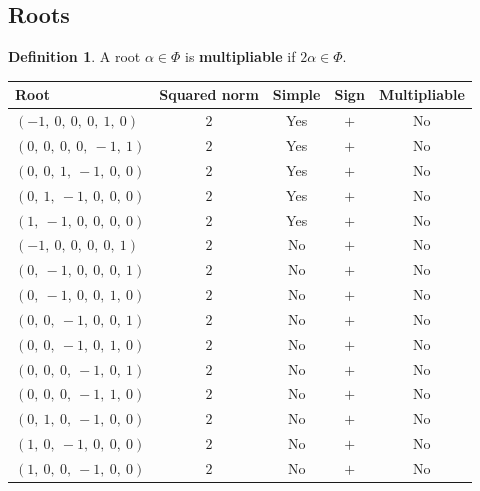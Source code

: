 \documentclass[11pt]{article}
\newcommand{\noi}{\noindent}
\newcommand{\tbf}{\textbf}
\theoremstyle{definition}
\newtheorem{definition}{Definition}[section]
\begin{document}
\subsection{Roots}

\begin{definition}
A root $\alpha \in \Phi$ is \tbf{multipliable} if $2\alpha \in \Phi$.
\end{definition}

\noi \begin{tabular}{|l|c|c|c|c|}
    \hline
    \textbf{Root} & \textbf{Squared norm} & \textbf{Simple} & \textbf{Sign} & \textbf{Multipliable} \\
    \hline
    $\left( -1, \  0, \  0, \  0, \  1, \  0\right)$ & $2$ & Yes & $+$ & No \\
    \hline
    $\left( 0, \  0, \  0, \  0, \  -1, \  1\right)$ & $2$ & Yes & $+$ & No \\
    \hline
    $\left( 0, \  0, \  1, \  -1, \  0, \  0\right)$ & $2$ & Yes & $+$ & No \\
    \hline
    $\left( 0, \  1, \  -1, \  0, \  0, \  0\right)$ & $2$ & Yes & $+$ & No \\
    \hline
    $\left( 1, \  -1, \  0, \  0, \  0, \  0\right)$ & $2$ & Yes & $+$ & No \\
    \hline
    $\left( -1, \  0, \  0, \  0, \  0, \  1\right)$ & $2$ & No & $+$ & No \\
    \hline
    $\left( 0, \  -1, \  0, \  0, \  0, \  1\right)$ & $2$ & No & $+$ & No \\
    \hline
    $\left( 0, \  -1, \  0, \  0, \  1, \  0\right)$ & $2$ & No & $+$ & No \\
    \hline
    $\left( 0, \  0, \  -1, \  0, \  0, \  1\right)$ & $2$ & No & $+$ & No \\
    \hline
    $\left( 0, \  0, \  -1, \  0, \  1, \  0\right)$ & $2$ & No & $+$ & No \\
    \hline
    $\left( 0, \  0, \  0, \  -1, \  0, \  1\right)$ & $2$ & No & $+$ & No \\
    \hline
    $\left( 0, \  0, \  0, \  -1, \  1, \  0\right)$ & $2$ & No & $+$ & No \\
    \hline
    $\left( 0, \  1, \  0, \  -1, \  0, \  0\right)$ & $2$ & No & $+$ & No \\
    \hline
    $\left( 1, \  0, \  -1, \  0, \  0, \  0\right)$ & $2$ & No & $+$ & No \\
    \hline
    $\left( 1, \  0, \  0, \  -1, \  0, \  0\right)$ & $2$ & No & $+$ & No \\

\end{tabular}
\end{document}

